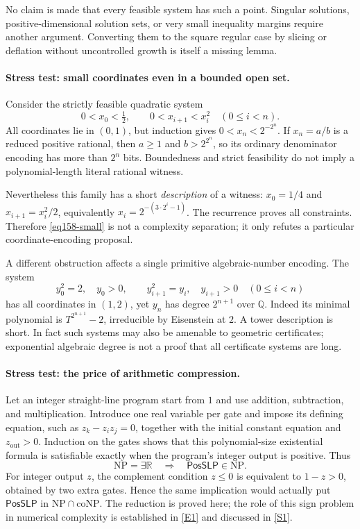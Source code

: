 \documentclass[11pt,a4paper]{article}
\newcommand{\Q}{\mathbb{Q}}
\newcommand{\R}{\mathbb{R}}
\newcommand{\sref}[2]{\hyperlink{source:#1:#2}{[S#2]}}
\newcommand{\eref}[2]{\hyperlink{extra:#1:#2}{[E#2]}}
\numberwithin{equation}{section}
\begin{document}
No claim is made that every feasible system has such a point. Singular
solutions, positive-dimensional solution sets, or very small inequality
margins require another argument. Converting them to the square regular
case by slicing or deflation without uncontrolled growth is itself a
missing lemma.

\paragraph{Stress test: small coordinates even in a bounded open set.}
Consider the strictly feasible quadratic system
\begin{equation}\label{eq158-small}
 0<x_0<\tfrac12,\qquad 0<x_{i+1}<x_i^2\quad(0\le i<n).
\end{equation}
All coordinates lie in $(0,1)$, but induction gives
$0<x_n<2^{-2^n}$. If $x_n=a/b$ is a reduced positive rational, then
$a\ge1$ and $b>2^{2^n}$, so its ordinary denominator encoding has more
than $2^n$ bits. Boundedness and strict feasibility do not imply a
polynomial-length literal rational witness.

Nevertheless this family has a short \emph{description} of a witness:
$x_0=1/4$ and $x_{i+1}=x_i^2/2$, equivalently
$x_i=2^{-(3\cdot2^i-1)}$. The recurrence proves all constraints.
Therefore \eqref{eq158-small} is not a complexity separation; it only
refutes a particular coordinate-encoding proposal.

A different obstruction affects a single primitive algebraic-number
encoding. The system
\[
 y_0^2=2,\quad y_0>0,\qquad y_{i+1}^2=y_i,\quad y_{i+1}>0
       \quad(0\le i<n)
\]
has all coordinates in $(1,2)$, yet $y_n$ has degree $2^{n+1}$ over $\Q$.
Indeed its minimal polynomial is $T^{2^{n+1}}-2$, irreducible by
Eisenstein at $2$. A tower description is short. In fact such systems may
also be amenable to geometric certificates; exponential algebraic degree
is not a proof that all certificate systems are long.

\paragraph{Stress test: the price of arithmetic compression.}
Let an integer straight-line program start from $1$ and use addition,
subtraction, and multiplication. Introduce one real variable per gate and
impose its defining equation, such as $z_k-z_i z_j=0$, together with the
initial constant equation and $z_{\mathrm{out}}>0$. Induction on the gates
shows that this polynomial-size existential formula is satisfiable exactly
when the program's integer output is positive. Thus
\begin{equation}\label{eq158-posslp}
 \mathrm{NP}=\exists\R\quad\Longrightarrow\quad
 \textsf{PosSLP}\in\mathrm{NP}.
\end{equation}
For integer output $z$, the complement condition $z\le0$ is equivalent to
$1-z>0$, obtained by two extra gates. Hence the same implication would
actually put $\textsf{PosSLP}$ in $\mathrm{NP}\cap\mathrm{coNP}$.
The reduction is proved here; the role of this sign problem in numerical
complexity is established in \eref{158}{1} and discussed in
\sref{158}{1}.
\end{document}
